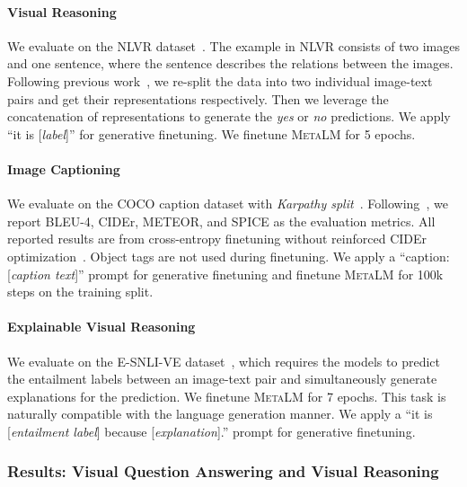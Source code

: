 \documentclass{article}
\theoremstyle{plain}
\theoremstyle{definition}
\theoremstyle{remark}
\newcommand\ours{\textsc{MetaLM}}
\begin{document}
\paragraph{Visual Reasoning}
We evaluate on the NLVR dataset~\citep{nlvrv2}. The example in NLVR consists of two images and one sentence, where the sentence describes the relations between the images. Following previous work~\citep{tan2019lxmert,li2020oscar}, we re-split the data into two individual image-text pairs and get their representations respectively. Then we leverage the concatenation of representations to generate the \textit{yes} or \textit{no} predictions.
We apply ``it is [\textit{label}]'' for generative finetuning.
We finetune \ours{} for 5 epochs.

\paragraph{Image Captioning}
We evaluate on the COCO caption dataset with \textit{Karpathy split}~\citep{karpathy2017deep}. Following~\citep{cho2021unifying}, we report BLEU-4, CIDEr, METEOR, and SPICE as the evaluation metrics. All reported results are from cross-entropy finetuning without reinforced CIDEr optimization~\citep{rennie2017self}. Object tags are not used during finetuning.
We apply a ``caption: [\textit{caption text}]'' prompt for generative finetuning and finetune \ours{} for 100k steps on the training split.

\paragraph{Explainable Visual Reasoning}
We evaluate on the E-SNLI-VE dataset~\citep{kayser2021vil}, which requires the models to predict the entailment labels between an image-text pair and simultaneously generate explanations for the prediction.
We finetune \ours{} for 7 epochs.
This task is naturally compatible with the language generation manner. We apply a ``it is [\textit{entailment label}] because [\textit{explanation}].'' prompt for generative finetuning.


\subsubsection{Results: Visual Question Answering and Visual Reasoning}
\end{document}
